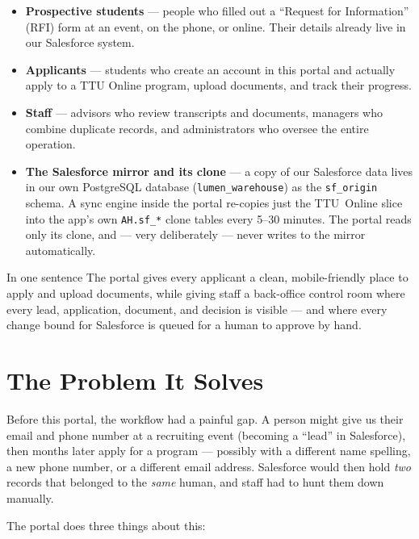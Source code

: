\documentclass[11pt,letterpaper]{report}
\begin{document}
\begin{itemize}[leftmargin=1.4em]
  \item \textbf{Prospective students} --- people who filled out a ``Request for
        Information'' (RFI) form at an event, on the phone, or online. Their
        details already live in our Salesforce system.
  \item \textbf{Applicants} --- students who create an account in this portal and
        actually apply to a TTU Online program, upload documents, and track
        their progress.
  \item \textbf{Staff} --- advisors who review transcripts and documents,
        managers who combine duplicate records, and administrators who oversee
        the entire operation.
  \item \textbf{The Salesforce mirror and its clone} --- a copy of our
        Salesforce data lives in our own PostgreSQL database
        (\texttt{lumen\_warehouse}) as the \texttt{sf\_origin} schema. A sync
        engine inside the portal re-copies just the TTU~Online slice into the
        app's own \texttt{AH.sf\_*} clone tables every 5--30 minutes. The
        portal reads only its clone, and --- very deliberately --- never writes
        to the mirror automatically.
\end{itemize}

\begin{keybox}{In one sentence}
The portal gives every applicant a clean, mobile-friendly place to apply and
upload documents, while giving staff a back-office control room where every
lead, application, document, and decision is visible --- and where every change
bound for Salesforce is queued for a human to approve by hand.
\end{keybox}

\section{The Problem It Solves}

Before this portal, the workflow had a painful gap. A person might give us their
email and phone number at a recruiting event (becoming a ``lead'' in
Salesforce), then months later apply for a program --- possibly with a different
name spelling, a new phone number, or a different email address. Salesforce
would then hold \emph{two} records that belonged to the \emph{same} human, and
staff had to hunt them down manually.

The portal does three things about this:
\end{document}
